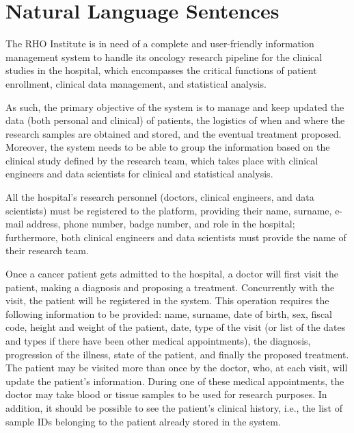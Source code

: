\section{Natural Language Sentences}

The RHO Institute is in need of a complete and user-friendly information management system to handle its oncology research pipeline for the clinical studies in the hospital, which encompasses the critical functions of patient enrollment, clinical data management, and statistical analysis.

As such, the primary objective of the system is to manage and keep updated the data (both personal and clinical) of patients, the logistics of when and where the research samples are obtained and stored, and the eventual treatment proposed. Moreover, the system needs to be able to group the information based on the clinical study defined by the research team, which takes place with clinical engineers and data scientists for clinical and statistical analysis.

All the hospital's research personnel (doctors, clinical engineers, and data scientists) must be registered to the platform, providing their name, surname, e-mail address, phone number, badge number, and role in the hospital; furthermore, both clinical engineers and data scientists must provide the name of their research team.

Once a cancer patient gets admitted to the hospital, a doctor will first visit the patient, making a diagnosis and proposing a treatment.
Concurrently with the visit, the patient will be registered in the system. This operation requires the following information to be provided: name, surname, date of birth, sex, fiscal code, height and weight of the patient, date, type of the visit (or list of the dates and types if there have been other medical appointments), the diagnosis, progression of the illness, state of the patient, and finally the proposed treatment. The patient may be visited more than once by the doctor, who, at each visit, will update the patient's information. During one of these medical appointments, the doctor may take blood or tissue samples to be used for research purposes. In addition, it should be possible to see the patient's clinical history, i.e., the list of sample IDs belonging to the patient already stored in the system.

